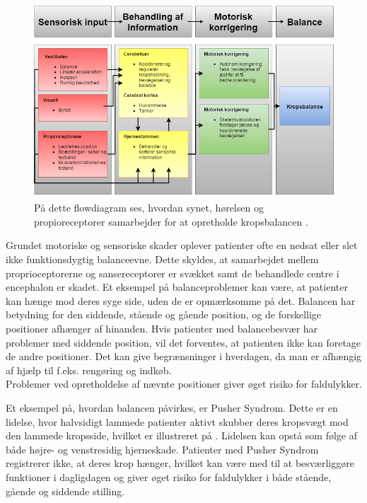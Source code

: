 \begin{figure}[H]
	\centering
	\includegraphics[scale=0.6]{figures/bProblemanalyse/Balance-Flowdiagram.png}
	\caption{På dette flowdiagram ses, hvordan synet, hørelsen og propioreceptorer samarbejder for at opretholde kropsbalancen \cite{watson2015}.}
	\label{flowbalance}
\end{figure}

Grundet motoriske og sensoriske skader oplever patienter ofte en nedsat eller slet ikke funktionsdygtig balanceevne. \cite{Karnath2003} Dette skyldes, at samarbejdet mellem proprioceptorerne og sansereceptorer er svækket samt de behandlede centre i encephalon er skadet. \cite{Martini2012}
Et eksempel på balanceproblemer kan være, at patienter kan hænge mod deres syge side, uden de er opmærksomme på det. Balancen har betydning for den siddende, stående og gående position, og de forskellige positioner afhænger af hinanden. Hvis patienter med balancebesvær har problemer med siddende position, vil det forventes, at patienten ikke kan foretage de andre positioner. Det kan give begrænsninger i hverdagen, da man er afhængig af hjælp til f.eks. rengøring og indkøb. \cite{Karnath2003} \\
Problemer ved opretholdelse af nævnte positioner giver øget risiko for faldulykker. \cite{Karnath2003} 

Et eksempel på, hvordan balancen påvirkes, er Pusher Syndrom. Dette er en lidelse, hvor halvsidigt lammede patienter aktivt skubber deres kropsvægt mod den lammede kropsside, hvilket er illustreret på . Lidelsen kan opstå som følge af både højre- og venstresidig hjerneskade. Patienter med Pusher Syndrom registrerer ikke, at deres krop hænger, hvilket kan være med til at besværliggøre funktioner i dagligdagen og giver øget risiko for faldulykker i både stående, gående og siddende stilling. \cite{Karnath2003} 

